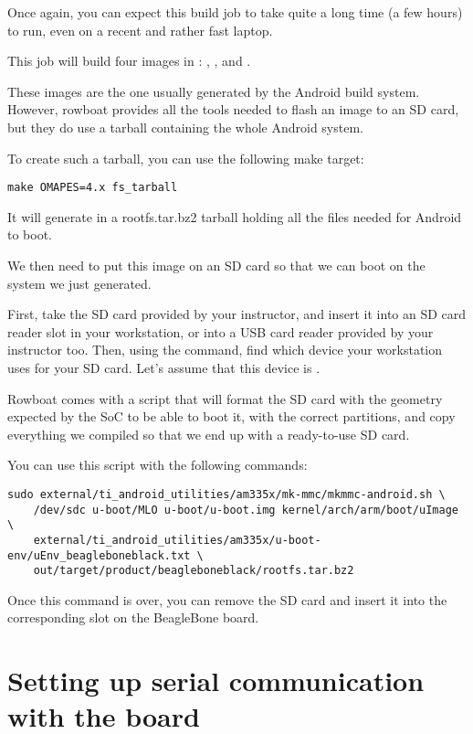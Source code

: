Once again, you can expect this build job to take quite a long time (a
few hours) to run, even on a recent and rather fast laptop.

This job will build four images in
: ,
,  and .

These images are the one usually generated by the Android build
system. However, rowboat provides all the tools needed to flash an
image to an SD card, but they do use a tarball containing the whole
Android system.

To create such a tarball, you can use the following make target:

\begin{verbatim}
make OMAPES=4.x fs_tarball
\end{verbatim}

It will generate in  a
rootfs.tar.bz2 tarball holding all the files needed for Android to
boot.

We then need to put this image on an SD card so that we can boot on
the system we just generated.

First, take the SD card provided by your instructor, and insert it
into an SD card reader slot in your workstation, or into a USB card
reader provided by your instructor too. Then, using the 
command, find which device your workstation uses for your SD card.
Let's assume that this device is .

Rowboat comes with a script that will format the SD card with the
geometry expected by the SoC to be able to boot it, with the correct
partitions, and copy everything we compiled so that we end up with a
ready-to-use SD card.

You can use this script with the following commands:

\begin{verbatim}
sudo external/ti_android_utilities/am335x/mk-mmc/mkmmc-android.sh \
    /dev/sdc u-boot/MLO u-boot/u-boot.img kernel/arch/arm/boot/uImage \
    external/ti_android_utilities/am335x/u-boot-env/uEnv_beagleboneblack.txt \
    out/target/product/beagleboneblack/rootfs.tar.bz2
\end{verbatim}

Once this command is over, you can remove the SD card and insert it
into the corresponding slot on the BeagleBone board.

\section{Setting up serial communication with the board}

